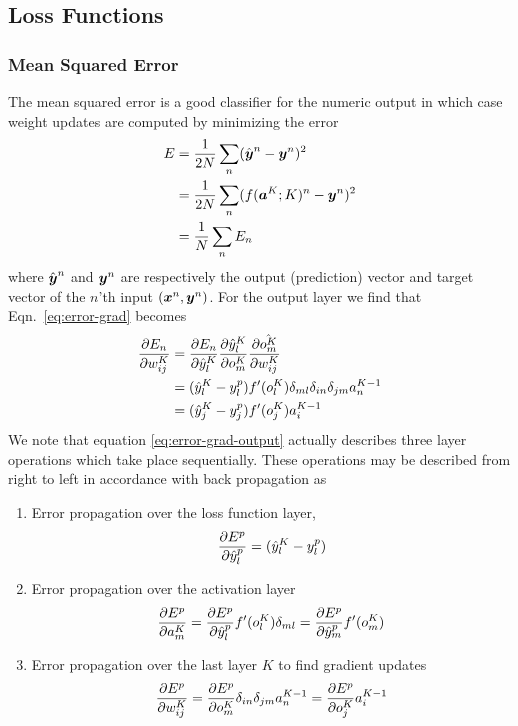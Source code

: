 \documentclass[12pt,notitlepage]{article}
\begin{document}
\subsection{Loss Functions}
\label{sec:loss-fun}


\subsubsection{Mean Squared Error}
\label{sec:error-mse}
The mean squared error is a good classifier for the numeric output in
which case weight updates are computed by minimizing the error
\begin{equation}
  \label{eq:error}
  \begin{split}
    E &= \frac{1}{2N}\sum_{n}(\hat{\boldsymbol{y}}^{n} - \boldsymbol{y}^{n} )^{2}\\
    &= \frac{1}{2N}\sum_{n}(f(\boldsymbol{a}^{K};K)^{n} - \boldsymbol{y}^{n} )^{2}\\
    &= \frac{1}{N}\sum_{n}E_{n}\\
  \end{split}
\end{equation}
where $\hat{\boldsymbol{y}}^{n}$ and $\boldsymbol{y}^{n}$ are respectively the
output (prediction) vector and target vector of the $n$'th input
$(\boldsymbol{x}^{n},\boldsymbol{y}^{n})$.  For the output layer we find that
Eqn.~\ref{eq:error-grad} becomes
\begin{equation}
  \label{eq:error-grad-output}
  \begin{split}
    \frac{\partial E_{n}}{\partial w^{K}_{ij}} &=
    \frac{\partial E_{n}}{\partial \hat{y}_{l}^{K}}\frac{\partial \hat{y}_{l}^{K}}{\partial o_{m}^{K}}\frac{\partial \hat{o_{m}^{K}}}{\partial w_{ij}^{K}}\\
    &= (\hat{y}_{l}^{K} - y^{p}_{l} )f'(o_{l}^{K})\delta_{ml}\delta_{in}\delta_{jm}a_{n}^{K-1}\\
    &= (\hat{y}_{j}^{K} - y^{p}_{j} )f'(o_{j}^{K})a_{i}^{K-1}
  \end{split}
\end{equation}
We note that equation \ref{eq:error-grad-output} actually describes
three layer operations which take place sequentially.  These
operations may be described from right to left in accordance with back
propagation as
\begin{enumerate}
\item Error propagation over the loss function layer,
  \begin{equation}
    \label{eq:error-loss-fcn}
    \frac{\partial E^{p}}{\partial \hat{y}_{l}^{p}} = (\hat{y}_{l}^{K} - y^{p}_{l})
  \end{equation}
\item Error propagation over the activation layer
  \begin{equation}
    \label{eq:error-act-fun}
    \frac{\partial E^{p}}{\partial a_{m}^{K}} =
    \frac{\partial E^{p}}{\partial \hat{y}_{l}^{p}}f'(o_{l}^{K})\delta_{ml} = \frac{\partial E^{p}}{\partial \hat{y}_{m}^{p}}f'(o_{m}^{K})
  \end{equation}
\item Error propagation over the last layer $K$ to find gradient updates
  \begin{equation}
    \label{eq:error-last-layer}
    \frac{\partial E^{p}}{\partial w_{ij}^{K}} =
    \frac{\partial E^{p}}{\partial o_{m}^{K}}\delta_{in}\delta_{jm}a_{n}^{K-1} = \frac{\partial E^{p}}{\partial o_{j}^{K}}a_{i}^{K-1}
  \end{equation}
\end{enumerate}
\end{document}

